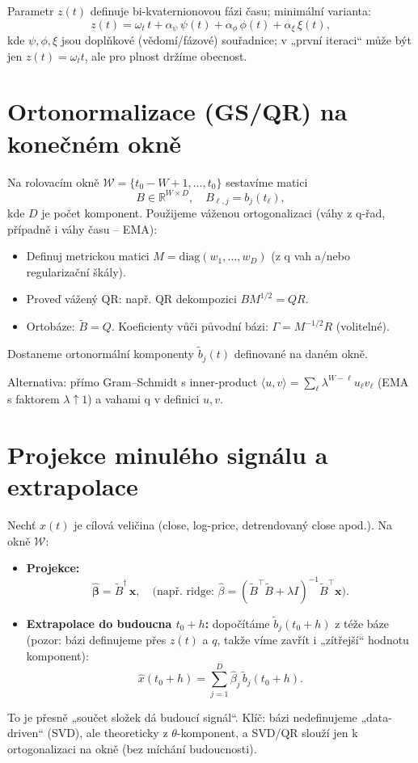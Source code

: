 \documentclass[12pt, a4paper]{article}
\begin{document}
Parametr $z(t)$ definuje bi-kvaternionovou fázi času; minimální varianta:
$$
z(t) = \omega_t \, t + \alpha_\psi \,\psi(t) + \alpha_\phi \,\phi(t) + \alpha_\xi \,\xi(t),
$$
kde $\psi,\phi,\xi$ jsou doplňkové (vědomí/fázové) souřadnice; v „první iteraci“ může být jen $z(t)=\omega_t t$, ale pro plnost držíme obecnost.

\section{Ortonormalizace (GS/QR) na konečném okně}
Na rolovacím okně $\mathcal{W}=\{t_0-W+1,\ldots,t_0\}$ sestavíme matici
$$
B \in \mathbb{R}^{W\times D}, \quad B_{\ell,j} = b_j(t_\ell),
$$
kde $D$ je počet komponent. Použijeme váženou ortogonalizaci (váhy z q-řad, případně i váhy času – EMA):
\begin{itemize}
    \item Definuj metrickou matici $M=\mathrm{diag}(w_1,\ldots,w_D)$ (z q vah a/nebo regularizační škály).
    \item Proveď vážený QR: např. QR dekompozici $B M^{1/2} = Q R$.
    \item Ortobáze: $\tilde{B} = Q$. Koeficienty vůči původní bázi: $\Gamma = M^{-1/2} R$ (volitelné).
\end{itemize}
Dostaneme ortonormální komponenty $\tilde{b}_j(t)$ definované na daném okně.

Alternativa: přímo Gram–Schmidt s inner-product $\langle u,v\rangle = \sum_{\ell} \lambda^{W-\ell} u_\ell v_\ell$ (EMA s faktorem $\lambda\uparrow 1$) a vahami q v definici $u,v$.

\section{Projekce minulého signálu a extrapolace}
Nechť $x(t)$ je cílová veličina (close, log-price, detrendovaný close apod.). Na okně $\mathcal{W}$:
\begin{itemize}
    \item \textbf{Projekce:}
    $$
    \hat{\boldsymbol{\beta}} = \tilde{B}^\dagger \, \mathbf{x}, \quad \text{(např. ridge: } \hat\beta = (\tilde{B}^\top\tilde{B} + \lambda I)^{-1}\tilde{B}^\top \mathbf{x}).
    $$
    \item \textbf{Extrapolace do budoucna $t_0+h$:} dopočítáme $\tilde{b}_j(t_0+h)$ z téže báze (pozor: bázi definujeme přes $z(t)$ a $q$, takže víme zavřít i „zítřejší“ hodnotu komponent):
    $$
    \hat{x}(t_0+h) = \sum_{j=1}^D \hat{\beta}_j \, \tilde{b}_j(t_0+h).
    $$
\end{itemize}
To je přesně „součet složek dá budoucí signál“. Klíč: bázi nedefinujeme „data-driven“ (SVD), ale theoreticky z $\theta$-komponent, a SVD/QR slouží jen k ortogonalizaci na okně (bez míchání budoucnosti).
\end{document}
